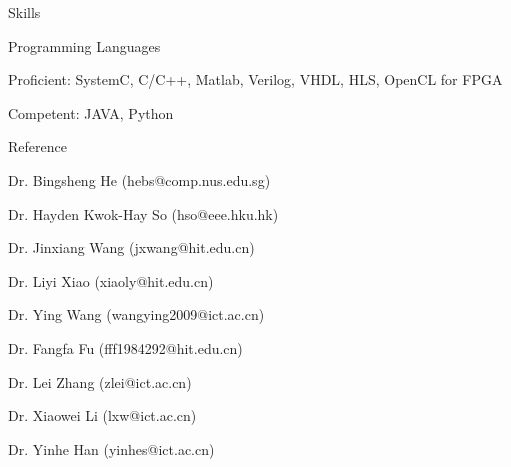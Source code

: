 \documentclass{resume} %
\begin{document}
\begin{rSection}{Skills}
    \begin{rSubsection}{Programming Languages}{}{}{}
    \item Proficient: SystemC, C/C++, Matlab, Verilog, VHDL, HLS, OpenCL for FPGA
    \item Competent: JAVA, Python
    \end{rSubsection}
\end{rSection}

\begin{rSection}{Reference}
	\vspace{-1em}
\item Dr. Bingsheng He                              (hebs@comp.nus.edu.sg)
\item Dr. Hayden Kwok-Hay So                        (hso@eee.hku.hk)
\item Dr. Jinxiang Wang                             (jxwang@hit.edu.cn)
\item Dr. Liyi Xiao                                 (xiaoly@hit.edu.cn)
\item Dr. Ying Wang                                 (wangying2009@ict.ac.cn)
\item Dr. Fangfa Fu                                 (fff1984292@hit.edu.cn)
\item Dr. Lei Zhang                                 (zlei@ict.ac.cn)
\item Dr. Xiaowei Li                                (lxw@ict.ac.cn)
\item Dr. Yinhe Han                                 (yinhes@ict.ac.cn)
\end{rSection}
\end{document}
